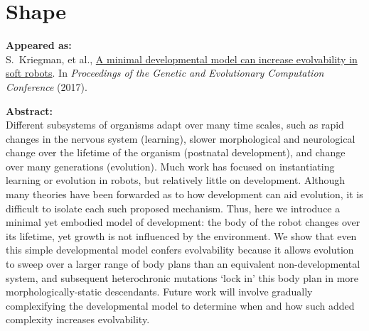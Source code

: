 

\chapter{Shape}

\textbf{Appeared as:}\\
S.~Kriegman, et al., 
\href{https://dl.acm.org/doi/abs/10.1145/3071178.3071296}{\color{blue}A minimal developmental model can increase evolvability in soft robots}. In
\textit{Proceedings of the Genetic and Evolutionary Computation Conference} (2017).

\vspace{1em}

\noindent
\textbf{Abstract:}\\
\noindent
Different subsystems of organisms adapt over many time scales,
such as rapid changes in the nervous system (learning),
slower morphological and neurological change over the lifetime 
of the organism (postnatal development), and change over
many generations (evolution). Much work has
focused on instantiating learning or evolution in robots, but relatively
little on development. Although many theories have been
forwarded as to how development can aid evolution, it is difficult
to isolate each such proposed mechanism. Thus, here we introduce
a minimal yet embodied model of development: the body of the
robot changes over its lifetime, yet growth is not influenced
by the environment. We show that even this simple developmental
model confers
evolvability because it allows evolution to sweep over a larger
range of body plans than an equivalent non-developmental system,
and subsequent heterochronic mutations
`lock in' this body plan in more morphologically-static descendants.
Future work will involve gradually complexifying the developmental
model to determine when and how such added complexity increases
evolvability.










